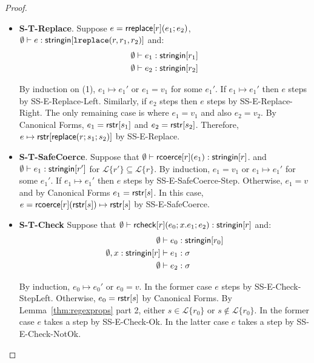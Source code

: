 \documentclass[11pt,leqno]{article}
\theoremstyle{definition}
\newcommand{\Lagr}{\mathcal{L}}
\newcommand{\lang}[1]{\Lagr\{#1\}}
\newcommand{\rcoerce}[2]{{\sf rcoerce}[#1](#2)}
\newcommand{\sistr}[1]{{\sf rstr}[#1]}   \newcommand{\rstr}[1]{{\sf rstr}[#1]} %
\newcommand{\rcheck}[4]{ {\sf rcheck}[#1](#2;#3;#4) }
\newcommand{\strin}[1]{\sistr{#1}}
\newcommand{\stringin}[1]{{\sf stringin}[#1]}
\newcommand{\lsubst}[3]{{\sf replace}(#1;#2;#3)} %
\newcommand{\lreplace}[3]{{\sf lreplace}(#1; #2; #3)}
\renewcommand{\lreplace}[3]{{\tt lreplace}(#1, #2, #3)}
\begin{document}
\begin{proof}
\begin{itemize}[label=$ $,itemsep=1ex]
\item \textbf{S-T-Replace}.
Suppose $e = {\sf rreplace}[r](e_1;e_2)$, $\emptyset\vdash e : \stringin{\lreplace{r}{r_1}{r_2}}$ and:
\begin{align}
&\emptyset\vdash e_1 : \stringin{r_1} \\
&\emptyset\vdash e_2 : \stringin{r_2}
\end{align}

By induction on (1), $e_1 \mapsto e_1'$ or $e_1 = v_1$  for some $e_1'$.
If $e_1 \mapsto e_1'$ then $e$ steps by SS-E-Replace-Left.
Similarly, if $e_2$ steps then $e$ steps by SS-E-Replace-Right.
The only remaining case is where $e_1 = v_1$ and also $e_2 = v_2$.
By Canonical Forms, $e_1 = \strin{s_1}$ and $e_2 = \strin{s_2}$.
Therefore, $e \mapsto \rstr{\lsubst{r}{s_1}{s_2}}$ by SS-E-Replace.

\item \textbf{S-T-SafeCoerce}.
Suppose that $\emptyset\vdash \rcoerce{r}{e_1} : \stringin{r}$.
and
$\emptyset\vdash e_1 : \stringin{r'}$ for $\lang{r'} \subseteq \lang{r}$.%
By induction, $e_1 =v_1$ or $e_1 \mapsto e_1'$ for some $e_1'$.
If $e_1 \mapsto e_1'$ then $e$ steps by SS-E-SafeCoerce-Step.
Otherwise, $e_1 =v$ and by Canonical Forms $e_1 = \rstr{s}$.
In this case, $e = \rcoerce{r}{\rstr{s}} \mapsto \rstr{s}$ by SS-E-SafeCoerce.

\item \textbf{S-T-Check}
Suppose that $\emptyset\vdash \rcheck{r}{e_0}{x.e_1}{e_2} : \stringin{r}$ and:
\begin{align}
\emptyset &\vdash e_0 : \stringin{r_0}  \\
\emptyset, x:\stringin{r} &\vdash e_1 : \sigma \\
\emptyset &\vdash e_2 : \sigma \label{align6}
\end{align}

By induction,  $e_0 \mapsto e_0'$ or $e_0 = v$.
In the former case $e$ steps by SS-E-Check-StepLeft.
Otherwise, $e_0 = \rstr{s}$ by Canonical Forms.
By Lemma~\ref{thm:regexprops} part 2, either $s \in \lang{r_0}$ or $s \not\in\lang{r_0}$.
In the former case $e$ takes a step by SS-E-Check-Ok.
In the latter case $e$ takes a step by SS-E-Check-NotOk.

\end{itemize}

\end{proof}
\end{document}
